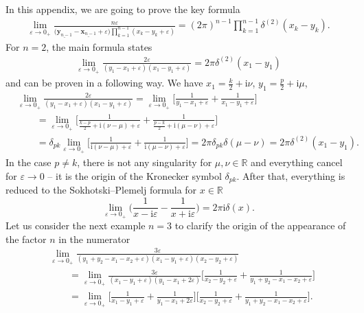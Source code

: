 \documentclass[pdftex]{sigma}
\renewcommand{\imath}{\mathrm{i}}
\numberwithin{equation}{section}
\begin{document}
In this appendix, we are going to prove
the key formula
\begin{align}\label{deltan}
\lim\limits_{\varepsilon\to 0_+}
\frac{n \varepsilon}
{\bigl(\underline{\bm{y}_{n-1}}-\underline{\bm{x}_{n-1}}+\varepsilon\bigr)
\prod_{k=1}^{n-1}(x_k-y_k+\varepsilon)} =
(2\pi)^{n-1} \prod\limits_{k=1}^{n-1}
\delta^{(2)}(x_k-y_k) .
\end{align}
For $n=2$, the main formula states
\begin{align*}
\lim\limits_{\varepsilon\to 0_+}
\frac{2\varepsilon}
{(y_1-x_1+\varepsilon)(x_1-y_1+\varepsilon)} =
2\pi \delta^{(2)}(x_1-y_1)
\end{align*}
and can be proven in a following way.
We have $x_1 = \tfrac{k}{2}+\imath\nu$,
$y_1 = \tfrac{p}{2}+\imath\mu$,
\begin{align*}
&
\lim\limits_{\varepsilon\to 0_+}
\frac{2\varepsilon}
{(y_1-x_1+\varepsilon)(x_1-y_1+\varepsilon)} =
\lim\limits_{\varepsilon\to 0_+}
\biggl[\frac{1}
{y_1-x_1+\varepsilon} +
\frac{1}
{x_1-y_1+\varepsilon}\biggr] \\
&\qquad =
\lim\limits_{\varepsilon\to 0_+}\biggl[
\frac{1}
{\tfrac{k-p}{2}+\imath(\nu-\mu)+\varepsilon}+
\frac{1}
{\tfrac{p-k}{2}+\imath(\mu-\nu)+\varepsilon}
\biggr] \\
&\qquad =
\delta_{p k}\lim\limits_{\varepsilon\to 0_+}\biggl[
\frac{1}
{\imath(\nu-\mu)+\varepsilon}+
\frac{1}
{\imath(\mu-\nu)+\varepsilon}
\biggr] =
2\pi \delta_{p k} \delta(\mu-\nu) =
2\pi \delta^{(2)}(x_1-y_1) .
\end{align*}
In the case $p \neq k$, there is not any singularity for $\mu,\nu \in \mathbb{R}$
and everything cancel for $\varepsilon \to 0$ -- it is the origin of the Kronecker symbol $\delta_{p k}$. After that, everything is reduced to the Sokhotski--Plemelj formula for $x\in \mathbb{R}$
\begin{equation*}
	\lim\limits_{\varepsilon\to 0_+}
	\biggl(\frac{1}{x -\imath\varepsilon}
	- \frac{1}{x +\imath\varepsilon}\biggr)
	= 2\pi\imath \delta(x) .
\end{equation*}
Let us consider the next example $n=3$ to clarify the origin
of the appearance of the factor $n$ in the numerator
\begin{align*}
&
\lim\limits_{\varepsilon\to 0_+}
\frac{3\varepsilon}
{(y_1+y_2-x_1-x_2+\varepsilon)(x_1-y_1+\varepsilon)(x_2-y_2+\varepsilon)} \\
&\qquad =
\lim\limits_{\varepsilon\to 0_+}
\frac{3\varepsilon}
{(x_1-y_1+\varepsilon)(y_1-x_1+2\varepsilon)}
\biggl[\frac{1}{x_2-y_2+\varepsilon}+\frac{1}{y_1+y_2-x_1-x_2+\varepsilon}
\biggr] \\
&\qquad =
\lim\limits_{\varepsilon\to 0_+}
\biggl[
\frac{1}
{x_1-y_1+\varepsilon}+
\frac{1}
{y_1-x_1+2\varepsilon}\biggr]
\biggl[\frac{1}{x_2-y_2+\varepsilon}+
\frac{1}{y_1+y_2-x_1-x_2+\varepsilon}
\biggr] .
\end{align*}
\end{document}
